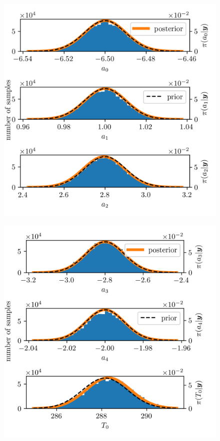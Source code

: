 \begin{figure}[ht!]
	\centering
	\includegraphics{PHdPTPost2.png}
	\caption[]{}
	\label{fig:}
\end{figure}
\begin{figure}[ht!]
	\centering
	\includegraphics{PHdPTPost3.png}
	\caption[]{}
	\label{fig:}
\end{figure}
